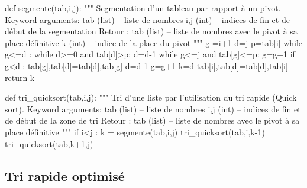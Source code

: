 \documentclass[10pt,fleqn]{article} %
\begin{document}
\begin{py}
\begin{python}
def segmente(tab,i,j):
    """
    Segmentation d'un tableau par rapport à un pivot.
    Keyword arguments: 
    tab (list) -- liste de nombres
    i,j (int) -- indices de fin et de début de la segmentation
    Retour :    
    tab (list) -- liste de nombres avec le pivot à sa place définitive
    k (int) -- indice de la place du pivot
    """
    g =i+1
    d=j
    p=tab[i]
    while g<=d :
        while d>=0 and tab[d]>p:
            d=d-1
        while g<=j and tab[g]<=p:
            g=g+1
        if g<d :
            tab[g],tab[d]=tab[d],tab[g]
            d=d-1
            g=g+1
    k=d
    tab[i],tab[d]=tab[d],tab[i]
    return k
\end{python}

\begin{python}
def tri_quicksort(tab,i,j):
    """
    Tri d'une liste par l'utilisation du tri rapide (Quick sort).
    Keyword arguments: 
    tab (list) -- liste de nombres
    i,j (int) -- indices de fin et de début de la zone de tri
    Retour :    
    tab (list) -- liste de nombres avec le pivot à sa place définitive
    """
    if i<j :
        k = segmente(tab,i,j)
        tri_quicksort(tab,i,k-1)
        tri_quicksort(tab,k+1,j)
\end{python}
\end{py}



\subsection{Tri rapide optimisé}
\end{document}
